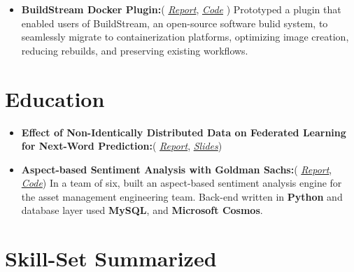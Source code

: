 \documentclass[a4paper]{deedy-resume} %
\begin{document}
\begin{itemize}
    \item \textbf{BuildStream Docker Plugin:}(
          \href{https://github.com/shashwatdalal/shashwatdalal.github.io/blob/master/files/placement_report.pdf}{\textit{Report}},
          \href{https://gitlab.com/BuildStream/bst-plugins-container}{\textit{Code}}
          )
          \linebreak
          Prototyped a plugin that enabled users of BuildStream, an open-source software bulid system, to
          seamlessly migrate to containerization platforms, optimizing image creation, reducing rebuilds, and preserving existing workflows.
\end{itemize}
\section{Education}
\begin{itemize}
    \item \textbf{Effect of Non-Identically Distributed Data on Federated Learning for Next-Word Prediction:}(
          \href{https://shashwatdalal.github.io/files/fl_fyp.pdf}{\textit{Report}},
          \href{https://bit.ly/3bpAU8g}{\textit{Slides}})
    \item \textbf{Aspect-based Sentiment Analysis with Goldman Sachs:}(
          \href{https://rb.gy/8juk2v}{\textit{Report}},
          \href{https://dev.azure.com/vapesoc/362\%20Software\%20Engineering\%20Project/}{\textit{Code}})
          \linebreak
          In a team of six, built an aspect-based sentiment analysis engine for the asset management engineering team. Back-end written in \textbf{Python} and database layer used \textbf{MySQL}, and \textbf{Microsoft Cosmos}.

\end{itemize}
\section{Skill-Set Summarized}
\end{document}

